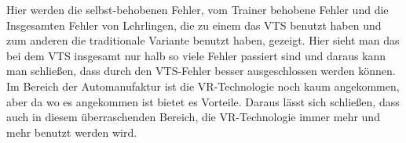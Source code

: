 Hier werden die selbst-behobenen Fehler, vom Trainer behobene Fehler und die Insgesamten Fehler von Lehrlingen, die zu einem das VTS benutzt haben und zum anderen die traditionale Variante benutzt haben, gezeigt. Hier sieht man das bei dem VTS insgesamt nur halb so viele Fehler passiert sind und daraus kann man schließen, dass durch den VTS-Fehler besser ausgeschlossen werden können\cite{langley2016establishing}.
Im Bereich der Automanufaktur ist die VR-Technologie noch kaum angekommen, aber da wo es angekommen ist bietet es Vorteile. Daraus lässt sich schließen, dass auch in diesem überraschenden Bereich, die VR-Technologie immer mehr und mehr benutzt werden wird.
